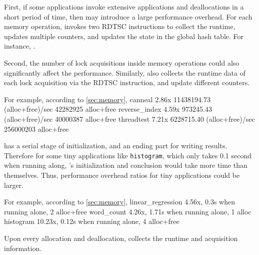 First, if some applications invoke extensive applications and deallocations in a short period of time, then \MP{} may introduce a large performance overhead. For each memory operation, \MP{} invokes two RDTSC instructions to collect the runtime,  updates multiple counters, and updates the state in the global hash table.  For instance, \todo{}. 

Second, the number of lock acquisitions inside memory operations could also significantly affect the performance. Similarly, \MP{} also collects the runtime data of each lock acquisition via the RDTSC instruction, and update different counters. 


For example, according to \ref{sec:memory}, 
canneal 2.86x   11438194.73 (alloc+free)/sec    42282925 alloc+free
reverse_index 4.59x 973245.43 (alloc+free)/sec 40000387 alloc+free
threadtest 7.21x 6228715.40 (alloc+free)/sec 256000203 alloc+free

\MP{} has a serial stage of initialization, and an ending part for writing results. Therefore for some tiny applications like \texttt{histogram}, which only takes 0.1 second when running along, \MP{}'s initialization and conclusion would take more time than themselves. Thus, performance overhead ratios for tiny applications could be larger.

For example, according to \ref{sec:memory}, 
linear_regression 4.56x, 0.3s when running alone, 2 alloc+free
word_count 4.26x, 1.71s when running alone, 1 alloc
histogram 10.23x, 0.12s when running alone, 4 alloc+free

Upon every allocation and deallocation, \MP{} collects the runtime and acquisition information.

